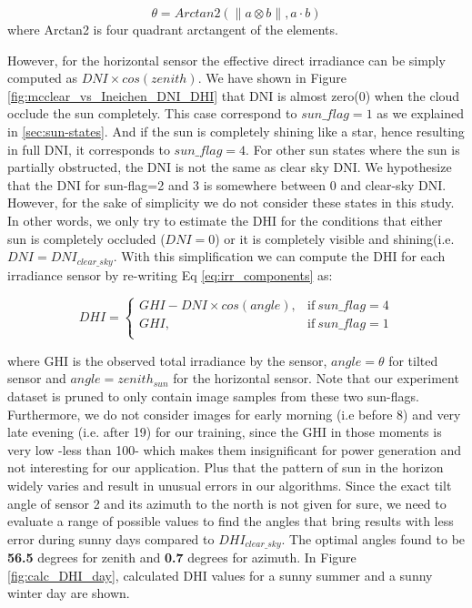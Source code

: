 \begin{equation}
\label{eq:angle_sun_tilted}
\theta = Arctan2(\| a \otimes b \|, a \cdot b)
\end{equation} 
where Arctan2 is four quadrant arctangent of the elements.

However, for the horizontal sensor the effective direct irradiance can be simply computed as $DNI \times cos(zenith)$. We have shown in Figure \ref{fig:mcclear_vs_Ineichen_DNI_DHI} that DNI is almost zero(0) when the cloud occlude the sun completely. This case correspond to $sun\_flag=1$ as we explained in \ref{sec:sun-states}. And if the sun is completely shining like a star, hence resulting in full DNI, it corresponds to  $sun\_flag=4$. For other sun states where the sun is partially obstructed, the DNI is not the same as clear sky DNI. We hypothesize that the DNI for sun-flag=2 and 3 is somewhere between 0 and clear-sky DNI. However, for the sake of simplicity we do not consider these states in this study. In other words, we only try to estimate the DHI for the conditions that either sun is completely occluded ($DNI=0$) or it is completely visible and shining(i.e. $DNI=DNI_{clear\_sky}$. With this simplification we can compute the DHI for each irradiance sensor by re-writing Eq \ref{eq:irr_components} as:

\begin{equation}
\label{eq:DHI_eq}
DHI =
    \begin{cases}
      GHI - DNI \times cos (angle), & \text{if}\ sun\_flag=4 \\
      GHI, & \text{if}\ sun\_flag=1 \\
    \end{cases}
\end{equation}

where GHI is the observed total irradiance by the sensor, $angle=\theta$ for tilted sensor and $angle=zenith_{sun}$ for the horizontal sensor. Note that our experiment dataset is pruned to only contain image samples from these two sun-flags. Furthermore, we do not consider images for early morning (i.e before 8) and very late evening (i.e. after 19) for our training, since the GHI in those moments is very low -less than 100- which makes them insignificant for power generation and not interesting for our application. Plus that the pattern of sun in the horizon widely varies and result in unusual errors in our algorithms. Since the exact tilt angle of sensor 2 and its azimuth to the north is not given for sure, we need to evaluate a range of possible values to find the angles that bring results with less error during sunny days compared to $DHI_{clear\_sky}$.  The optimal angles found to be \textbf{56.5} degrees for zenith and \textbf{0.7} degrees for azimuth. 
In Figure \ref{fig:calc_DHI_day}, calculated DHI values for a sunny summer and a sunny winter day are shown.

